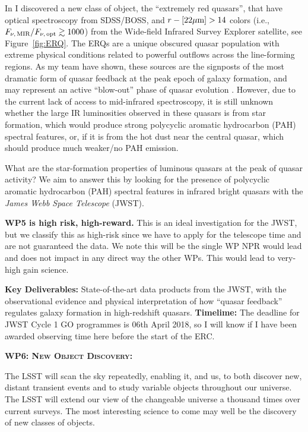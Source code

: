\smallskip
\smallskip
\noindent
In \citet{Ross2015} I discovered a new class of object, the ``extremely red
quasars'', that have optical spectroscopy from SDSS/BOSS, and
$r-[22\mu{\rm m}]>14$ colors (i.e., $F_{\nu,\, {\rm MIR}} / F_{\nu,\,
{\rm opt}} \gtrsim 1000$) from the Wide-field Infrared Survey Explorer
\citep[WISE;][]{Wright2010} satellite, see Figure~\ref{fig:ERQ}.  The ERQs are a
unique obscured quasar population with extreme physical conditions
related to powerful outflows across the line-forming regions. As my team 
have shown, these
sources are the signposts of the most dramatic form of quasar feedback
at the peak epoch of galaxy formation, and may represent an active
``blow-out'' phase of quasar evolution \citep{Zakamska2016, Hamann2017}.  
 However, due to
the current lack of access to mid-infrared spectroscopy, it is still
unknown whether the large IR luminosities observed in these quasars is
from star formation, which would produce strong polycyclic aromatic
hydrocarbon (PAH) spectral features, or, if it is from the hot dust
near the central quasar, which should produce much weaker/no PAH
emission.

\smallskip
\smallskip
\noindent
What are the star-formation properties of luminous quasars at the peak
of quasar activity?  We aim to answer this by looking for the presence
of polycyclic aromatic hydrocarbon (PAH) spectral features in infrared
bright quasars with the {\it James Webb Space Telescope} (JWST).  

\smallskip
\smallskip
\noindent
{\bf WP5 is high risk, high-reward.}  This is an ideal investigation for
the JWST, but we classify this as high-risk since we have to apply for
the telescope time and are not guaranteed the data.  We note this will
be the single WP NPR would lead and does not impact in any direct way
the other WPs. This would lead to very-high gain science.  

\smallskip
\smallskip
\noindent
{\bf Key
Deliverables:} State-of-the-art data products from the JWST, with the
observational evidence and physical interpretation of how ``quasar
feedback'' regulates galaxy formation in high-redshift quasars.
{\bf Timelime:} The deadline for JWST Cycle 1 GO programmes is 
06th April 2018, so I will know if I have been awarded observing 
time here before the start of the ERC. 


\medskip
\medskip
\smallskip
\smallskip
\noindent
\textbf{\textsc{WP6: New Object Discovery:}} 

\smallskip
\smallskip
\noindent
The LSST will scan the sky repeatedly, enabling it, and us, to both
discover new, distant transient events and to study variable objects
throughout our universe. The LSST will extend our view of the
changeable universe a thousand times over current surveys.  The most
interesting science to come may well be the discovery of new classes
of objects.

